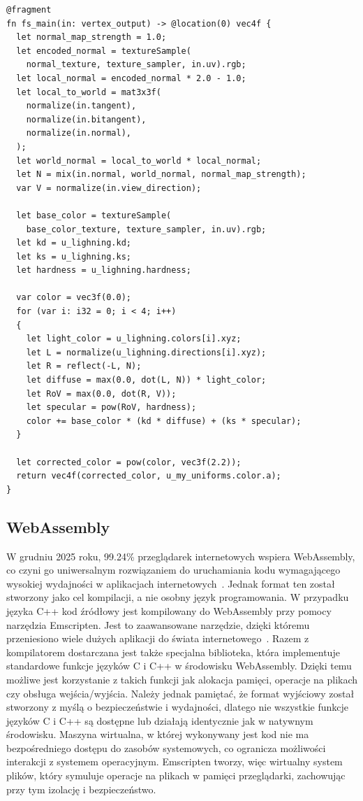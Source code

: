 \begin{lstlisting}[style=wgsl,caption=Shader fragmentów w WGSL, label=lst:wgsl_fragment_shader]
@fragment
fn fs_main(in: vertex_output) -> @location(0) vec4f {
  let normal_map_strength = 1.0;
  let encoded_normal = textureSample(
    normal_texture, texture_sampler, in.uv).rgb;
  let local_normal = encoded_normal * 2.0 - 1.0;
  let local_to_world = mat3x3f(
    normalize(in.tangent),
    normalize(in.bitangent),
    normalize(in.normal),
  );
  let world_normal = local_to_world * local_normal;
  let N = mix(in.normal, world_normal, normal_map_strength);
  var V = normalize(in.view_direction);

  let base_color = textureSample(
    base_color_texture, texture_sampler, in.uv).rgb;
  let kd = u_lighning.kd;
  let ks = u_lighning.ks;
  let hardness = u_lighning.hardness;

  var color = vec3f(0.0);
  for (var i: i32 = 0; i < 4; i++)
  {
    let light_color = u_lighning.colors[i].xyz;
    let L = normalize(u_lighning.directions[i].xyz);
    let R = reflect(-L, N);
    let diffuse = max(0.0, dot(L, N)) * light_color;
    let RoV = max(0.0, dot(R, V));
    let specular = pow(RoV, hardness);
    color += base_color * (kd * diffuse) + (ks * specular);
  }

  let corrected_color = pow(color, vec3f(2.2));
  return vec4f(corrected_color, u_my_uniforms.color.a);
}
\end{lstlisting}

\subsection{WebAssembly}
W grudniu 2025 roku, 99.24\% przeglądarek internetowych wspiera WebAssembly, co czyni go uniwersalnym rozwiązaniem do uruchamiania kodu wymagającego wysokiej wydajności w aplikacjach internetowych~\cite{caniuse-wasm}. Jednak format ten został stworzony jako cel kompilacji, a nie osobny język programowania. W przypadku języka C++ kod źródłowy jest kompilowany do WebAssembly przy pomocy narzędzia Emscripten. Jest to zaawansowane narzędzie, dzięki któremu przeniesiono wiele dużych aplikacji do świata internetowego~\cite{emscripten-examples}. Razem z kompilatorem dostarczana jest także specjalna biblioteka, która implementuje standardowe funkcje języków C i C++ w środowisku WebAssembly. Dzięki temu możliwe jest korzystanie z takich funkcji jak alokacja pamięci, operacje na plikach czy obsługa wejścia/wyjścia. Należy jednak pamiętać, że format wyjściowy został stworzony z myślą o bezpieczeństwie i wydajności, dlatego nie wszystkie funkcje języków C i C++ są dostępne lub działają identycznie jak w natywnym środowisku. Maszyna wirtualna, w której wykonywany jest kod nie ma bezpośredniego dostępu do zasobów systemowych, co ogranicza możliwości interakcji z systemem operacyjnym. Emscripten tworzy, więc wirtualny system plików, który symuluje operacje na plikach w pamięci przeglądarki, zachowując przy tym izolację i bezpieczeństwo.

